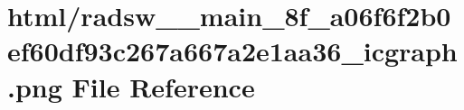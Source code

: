 \hypertarget{radsw____main__8f__a06f6f2b0ef60df93c267a667a2e1aa36__icgraph_8png}{}\section{html/radsw\+\_\+\+\_\+main\+\_\+8f\+\_\+a06f6f2b0ef60df93c267a667a2e1aa36\+\_\+icgraph.png File Reference}
\label{radsw____main__8f__a06f6f2b0ef60df93c267a667a2e1aa36__icgraph_8png}
